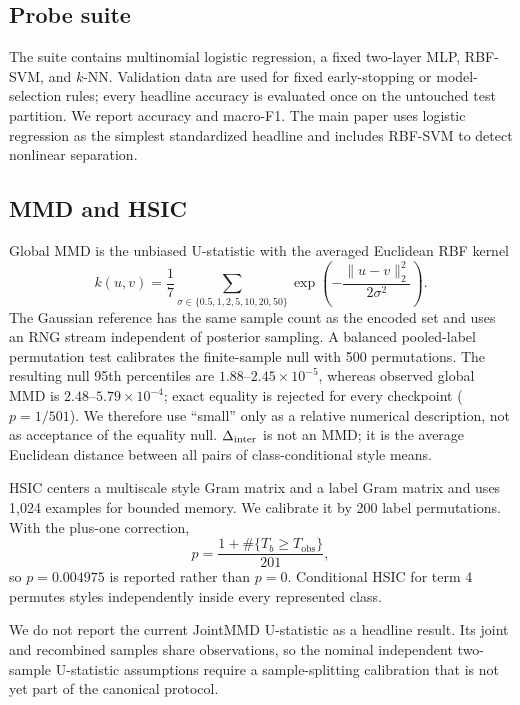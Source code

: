 \subsection{Probe suite}

The suite contains multinomial logistic regression, a fixed two-layer MLP,
RBF-SVM, and $k$-NN.  Validation data are used for fixed early-stopping or
model-selection rules; every headline accuracy is evaluated once on the
untouched test partition.  We report accuracy and macro-F1.  The main paper
uses logistic regression as the simplest standardized headline and includes
RBF-SVM to detect nonlinear separation.

\subsection{MMD and HSIC}

Global MMD is the unbiased U-statistic with the averaged Euclidean RBF kernel
\begin{equation}
k(u,v)=\frac17\sum_{\sigma\in\{0.5,1,2,5,10,20,50\}}
\exp\!\left(-\frac{\|u-v\|_2^2}{2\sigma^2}\right).
\end{equation}
The Gaussian reference has the same sample count as the encoded set and uses
an RNG stream independent of posterior sampling.  A balanced pooled-label
permutation test calibrates the finite-sample null with 500 permutations.
The resulting null 95th percentiles are $1.88$--$2.45\times10^{-5}$, whereas
observed global MMD is $2.48$--$5.79\times10^{-4}$; exact equality is rejected
for every checkpoint ($p=1/501$).  We therefore use ``small'' only as a
relative numerical description, not as acceptance of the equality null.
$\Delta_{\mathrm{inter}}$ is not an MMD; it is the average Euclidean distance between all
pairs of class-conditional style means.

HSIC centers a multiscale style Gram matrix and a label Gram matrix and uses
1,024 examples for bounded memory.  We calibrate it by 200 label
permutations.  With the plus-one correction,
\begin{equation}
p=\frac{1+\#\{T_b\ge T_{\mathrm{obs}}\}}{201},
\end{equation}
so $p=0.004975$ is reported rather than $p=0$.  Conditional HSIC for term 4
permutes styles independently inside every represented class.

We do not report the current JointMMD U-statistic as a headline result.  Its
joint and recombined samples share observations, so the nominal independent
two-sample U-statistic assumptions require a sample-splitting calibration
that is not yet part of the canonical protocol.

